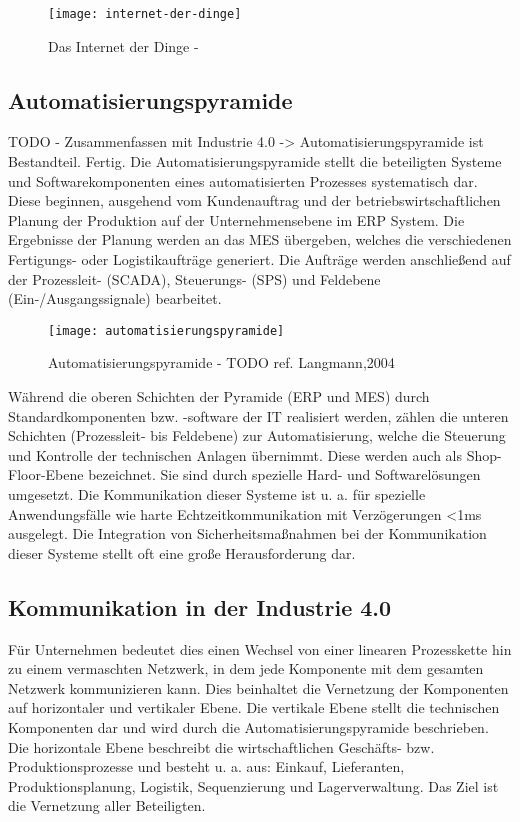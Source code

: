 \begin{figure}[h]
  \centering
  \texttt{[image: internet-der-dinge]}
  \caption{Das Internet der Dinge - \cite{rami2016}}
  \label{Kap2:Das Internet der Dinge}
\end{figure}

\clearpage

\subsection{Automatisierungspyramide}
\label{Grundlagen:Automatisierungspyramide}
TODO - Zusammenfassen mit Industrie 4.0 -> Automatisierungspyramide ist Bestandteil. Fertig.
Die Automatisierungspyramide stellt die beteiligten Systeme und Softwarekomponenten eines automatisierten Prozesses systematisch dar. Diese beginnen, ausgehend vom Kundenauftrag und der betriebswirtschaftlichen Planung der Produktion auf der Unternehmensebene im \ac{ERP} System. Die Ergebnisse der Planung werden an das \ac{MES} übergeben, welches die verschiedenen Fertigungs- oder Logistikaufträge generiert. Die Aufträge werden anschließend auf der Prozessleit- (\ac{SCADA}), Steuerungs- (\ac{SPS}) und Feldebene (Ein-/Ausgangssignale) bearbeitet.

\begin{figure}[h]
  \centering
  \texttt{[image: automatisierungspyramide]}
  \caption{Automatisierungspyramide - TODO ref. Langmann,2004}
  \label{Kap2:Automatisierungspyramide}
\end{figure}

\clearpage

Während die oberen Schichten der Pyramide (\ac{ERP} und \ac{MES}) durch Standardkomponenten bzw. -software der IT realisiert werden, zählen die unteren Schichten (Prozessleit- bis Feldebene) zur Automatisierung, welche die Steuerung und Kontrolle der technischen Anlagen übernimmt. Diese werden auch als Shop-Floor-Ebene bezeichnet. Sie sind durch spezielle Hard- und Softwarelösungen umgesetzt. Die Kommunikation dieser Systeme ist u. a. für spezielle Anwendungsfälle wie harte Echtzeitkommunikation mit Verzögerungen <1ms ausgelegt. Die Integration von Sicherheitsmaßnahmen bei der Kommunikation dieser Systeme stellt oft eine große Herausforderung dar.

\subsection{Kommunikation in der Industrie 4.0}
Für Unternehmen bedeutet dies einen Wechsel von einer linearen Prozesskette hin zu einem vermaschten Netzwerk, in dem jede Komponente mit dem gesamten Netzwerk kommunizieren kann. Dies beinhaltet die Vernetzung der Komponenten auf horizontaler und vertikaler Ebene. Die vertikale Ebene stellt die technischen Komponenten dar und wird durch die Automatisierungspyramide beschrieben. Die horizontale Ebene beschreibt die wirtschaftlichen Geschäfts- bzw. Produktionsprozesse und besteht u. a. aus: Einkauf, Lieferanten, Produktionsplanung, Logistik, Sequenzierung und Lagerverwaltung. Das Ziel ist die Vernetzung aller Beteiligten.

